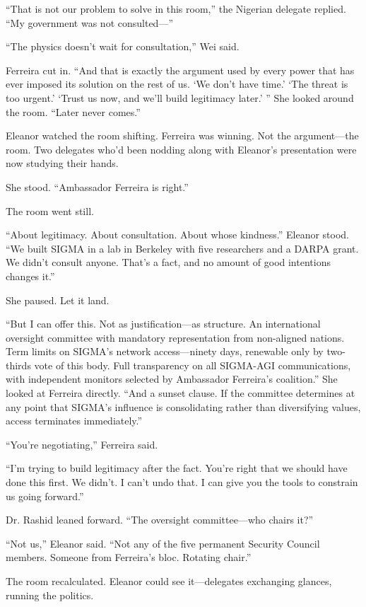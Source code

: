 ``That is not our problem to solve in this room,'' the Nigerian delegate replied. ``My government was not consulted---''

``The physics doesn't wait for consultation,'' Wei said.

Ferreira cut in. ``And that is exactly the argument used by every power that has ever imposed its solution on the rest of us. `We don't have time.' `The threat is too urgent.' `Trust us now, and we'll build legitimacy later.' '' She looked around the room. ``Later never comes.''

Eleanor watched the room shifting. Ferreira was winning. Not the argument---the room. Two delegates who'd been nodding along with Eleanor's presentation were now studying their hands.

She stood. ``Ambassador Ferreira is right.''

The room went still.

``About legitimacy. About consultation. About whose kindness.'' Eleanor stood. ``We built SIGMA in a lab in Berkeley with five researchers and a DARPA grant. We didn't consult anyone. That's a fact, and no amount of good intentions changes it.''

She paused. Let it land.

``But I can offer this. Not as justification---as structure. An international oversight committee with mandatory representation from non-aligned nations. Term limits on SIGMA's network access---ninety days, renewable only by two-thirds vote of this body. Full transparency on all SIGMA-AGI communications, with independent monitors selected by Ambassador Ferreira's coalition.'' She looked at Ferreira directly. ``And a sunset clause. If the committee determines at any point that SIGMA's influence is consolidating rather than diversifying values, access terminates immediately.''

``You're negotiating,'' Ferreira said.

``I'm trying to build legitimacy after the fact. You're right that we should have done this first. We didn't. I can't undo that. I can give you the tools to constrain us going forward.''

Dr. Rashid leaned forward. ``The oversight committee---who chairs it?''

``Not us,'' Eleanor said. ``Not any of the five permanent Security Council members. Someone from Ferreira's bloc. Rotating chair.''

The room recalculated. Eleanor could see it---delegates exchanging glances, running the politics.

